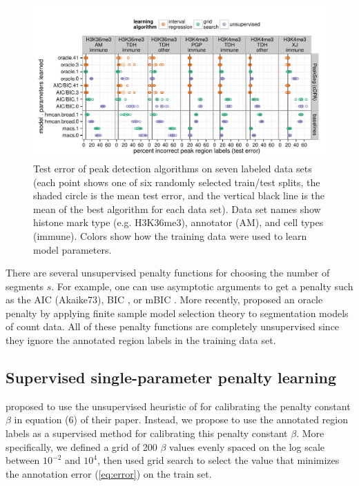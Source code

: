 \documentclass{article}
\begin{document}
\begin{figure}[b!]
  \centering
  \includegraphics[width=\textwidth]{figure-dp-peaks-regression-dots}
  \vskip -0.5cm
  \caption{Test error of peak detection algorithms on seven labeled
    data sets (each point shows one of six randomly selected
    train/test splits, the shaded circle is the mean test error, and
    the vertical black line is the mean of the best algorithm for each
    data set). Data set names show histone mark type (e.g. H3K36me3),
    annotator (AM), and cell types (immune). Colors show how the
    training data were used to learn model parameters.}
  \label{fig:test-error}
\end{figure}


There are several unsupervised penalty functions for choosing the
number of segments $s$. For example, one can use asymptotic arguments to
get a penalty such as the AIC (Akaike73), BIC \citep{Schwarz78}, or
mBIC \citep{mBIC}. More recently, \citet{cleynen2013segmentation}
proposed an oracle penalty by applying finite sample model selection
theory to segmentation models of count data. All of these penalty
functions are completely unsupervised since they ignore the annotated
region labels in the training data set.

\subsection{Supervised single-parameter penalty learning}
\label{sec:supervised}

\citet{cleynen2013segmentation} proposed to use the 
un\-supervised heuristic of \citet{Lav05} for calibrating the penalty
constant $\beta$ in equation (6) of their paper. Instead, we propose to
use the annotated region labels as a super\-vised method for calibrating
this penalty constant $\beta$. More specifically, we defined a grid of
200 $\beta$ values evenly spaced on the log scale between $10^{-2}$
and $10^4$, then used grid search to select the value that minimizes
the annotation error (\ref{eq:error}) on the train set.
\end{document}
